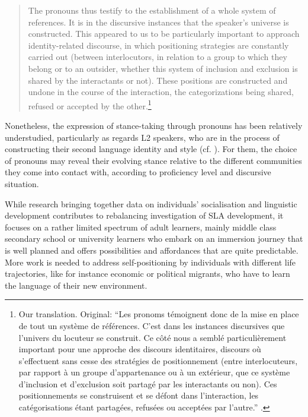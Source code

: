 \documentclass[output=paper]{langscibook}
\begin{document}
\begin{quote}
The pronouns thus testify to the establishment of a whole system of references. It is in the discursive instances that the speaker's universe is constructed. This appeared to us to be particularly important to approach iden\-ti\-ty-re\-lat\-ed discourse, in which positioning strategies are constantly carried out (between interlocutors, in relation to a group to which they belong or to an outsider, whether this system of inclusion and exclusion is shared by the interactants or not). These positions are constructed and undone in the course of the interaction, the categorizations being shared, refused or accepted by the other.\footnote{Our translation. Original: “Les pronoms témoignent donc de la mise en place de tout un système de références. C’est dans les instances discursives que l'univers du locuteur se construit. Ce côté nous a semblé particulièrement important pour une approche des discours identitaires, discours où s’effectuent sans cesse des stratégies de positionnement (entre interlocuteurs, par rapport à un groupe d’appartenance ou à un extérieur, que ce système d’inclusion et d’exclusion soit partagé par les interactants ou non). Ces positionnements se construisent et se défont dans l’interaction, les catégorisations étant partagées, refusées ou acceptées par l’autre.” \citep[53]{Langhans1996}.}\hbox{}\hfill\hbox{\citep[53]{Langhans1996}}
\end{quote}

Nonetheless, the expression of stance-taking through pronouns has been relatively understudied, particularly as regards L2 speakers, who are in the process of constructing their second language identity and style (cf. \citealt{Kirkham2011, Liao2009}). For them, the choice of pronouns may reveal their evolving stance relative to the different communities they come into contact with, according to proficiency level and discursive situation.

While research bringing together data on individuals’ socialisation and linguistic development contributes to rebalancing investigation of SLA development, it focuses on a rather limited spectrum of adult learners, mainly middle class secondary school or university learners who embark on an immersion journey that is well planned and offers possibilities and affordances that are quite predictable. More work is needed to address self-positioning by individuals with different life trajectories, like for instance economic or political migrants, who have to learn the language of their new environment.
\end{document}
